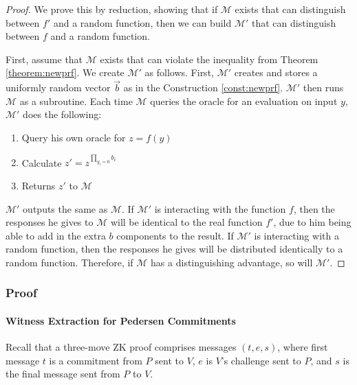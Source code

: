 \begin{proof}
We prove this by reduction, showing that if $\mathcal{M}$ exists that can distinguish between $f'$ and a random function, then we can build $\mathcal{M}'$ that can distinguish between $f$ and a random function.

First, assume that $\mathcal{M}$ exists that can violate the inequality from Theorem \ref{theorem:newprf}.  We create $\mathcal{M'}$ as follows.  First, $\mathcal{M}'$ creates and stores a uniformly random vector $\vec{b}$ as in the Construction \ref{const:newprf}.  $\mathcal{M}'$ then runs $\mathcal{M}$ as a subroutine.  Each time $\mathcal{M}$ queries the oracle for an evaluation on input $y$, $\mathcal{M}'$ does the following:

\begin{enumerate}
\item Query his own oracle for $z = f(y)$
\item Calculate $z' = z^{\prod_{y_i = 0} b_i}$
\item Returns $z'$ to $\mathcal{M}$
\end{enumerate}

$\mathcal{M}'$ outputs the same as $\mathcal{M}$.  If  $\mathcal{M}'$ is interacting with the function $f$, then the responses he gives to $\mathcal{M}$ will be identical to the real function $f'$, due to him being able to add in the extra $b$ components to the result.  If $\mathcal{M}'$ is interacting with a random function, then the responses he gives will be distributed identically to a random function.  Therefore, if $\mathcal{M}$ has a distinguishing advantage, so will $\mathcal{M}'$.
\end{proof}
 
\subsubsection{Proof}

\paragraph{Witness Extraction for Pedersen Commitments}
Recall that a three-move ZK proof comprises messages $(t,e,s)$, where
first message $t$ is a commitment from $P$ sent to $V$, $e$ is $V$'s
challenge sent to $P$, and $s$ is the final message sent from $P$ to
$V$.

